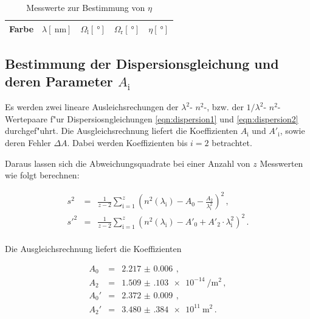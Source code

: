 		\begin{table}[h!]
			\begin{center}
				\caption{Messwerte zur Bestimmung von $\eta$ \label{table:eta}}
				\begin{tabular}{|c|c|c|c|c|}
					\hline
						Farbe & $\lambda [\SI{}{\nano \meter}]$ & $\Omega_\mathrm{l} [\SI{}{\degree}]$ & $\Omega_\mathrm{r} [\SI{}{\degree}]$ & $\eta [\SI{}{\degree}]$ \\
					\hline 
					\hline
						
					\hline 
				\end{tabular}
			\end{center}
		\end{table}		



	\subsection{Bestimmung der Dispersionsgleichung und deren Parameter $A_\mathrm{i}$}
	\label{subsec:dispersionskurve}
		Es werden zwei lineare Ausleichsrechungen der $\lambda^2$- $n^2$-, bzw. der $1 / \lambda^2$- $n^2$- Wertepaare f"ur Dispersiosngleichungen \eqref{eqn:dispersion1} und \eqref{eqn:dispersion2} durchgef"uhrt.
		Die Ausgleichsrechnung liefert die Koeffizienten $A_\mathrm{i}$ und $A'_\mathrm{i}$, sowie deren Fehler $\Delta A$.
		Dabei werden Koeffizienten bis $i = 2$ betrachtet.

		Daraus lassen sich die Abweichungsquadrate bei einer Anzahl von $z$ Messwerten wie folgt berechnen:

		\begin{eqnarray*}
			s^2 & = & \frac{1}{z - 2} \sum_{\mathrm{i} = 1}^z{\left(n^2(\lambda_\mathrm{i}) - A_0 - \frac{A_2}{\lambda_\mathrm{i}^2}\right)^2} \,, \\
			s'^2 & = & \frac{1}{z - 2} \sum_{\mathrm{i} = 1}^z{\left(n^2(\lambda_\mathrm{i}) - A'_0 + A'_2 \cdot \lambda_\mathrm{i}^2 \right)^2} \,. \\
		\end{eqnarray*}

		Die Ausgleichsrechnung liefert die Koeffizienten

		\begin{eqnarray*}
			A_0 & = & \SI{2.217(6)}{} \,, \\
			A_2 & = & \SI{1.509(103)e-14}{\per \meter \squared} \,, \\
			A_0' & = & \SI{2.372(9)}{} \,, \\
			A_2' & = & \SI{3.480(384)e11}{\meter \tothe{2}}\,. \\
		\end{eqnarray*}

